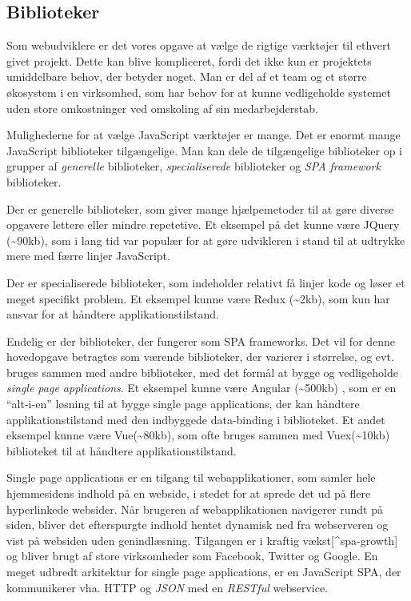 \documentclass[]{article}
\begin{document}
\hypertarget{biblioteker}{%
\subsection{Biblioteker}\label{biblioteker}}

Som webudviklere er det vores opgave at vælge de rigtige værktøjer til
ethvert givet projekt. Dette kan blive kompliceret, fordi det ikke kun
er projektets umiddelbare behov, der betyder noget. Man er del af et
team og et større økosystem i en virksomhed, som har behov for at kunne
vedligeholde systemet uden store omkostninger ved omskoling af sin
medarbejderstab.

Mulighederne for at vælge JavaScript værktøjer er mange. Det er enormt
mange JavaScript biblioteker tilgængelige. Man kan dele de tilgængelige
biblioteker op i grupper af \emph{generelle} biblioteker,
\emph{specialiserede} biblioteker og \emph{SPA framework} biblioteker.

Der er generelle biblioteker, som giver mange hjælpemetoder til at gøre
diverse opgavere lettere eller mindre repetetive. Et eksempel på det
kunne være JQuery (\textasciitilde{}90kb), som i lang tid var populær
for at gøre udvikleren i stand til at udtrykke mere med færre linjer
JavaScript.

Der er specialiserede biblioteker, som indeholder relativt få linjer
kode og løser et meget specifikt problem. Et eksempel kunne være Redux
(\textasciitilde{}2kb), som kun har ansvar for at håndtere
applikationstilstand.

Endelig er der biblioteker, der fungerer som SPA frameworks. Det vil for
denne hovedopgave betragtes som værende biblioteker, der varierer i
størrelse, og evt. bruges sammen med andre biblioteker, med det formål
at bygge og vedligeholde \emph{single page applications}. Et eksempel
kunne være Angular (\textasciitilde{}500kb) , som er en ``alt-i-en''
løsning til at bygge single page applications, der kan håndtere
applikationstilstand med den indbyggede data-binding i biblioteket. Et
andet eksempel kunne være Vue(\textasciitilde{}80kb), som ofte bruges
sammen med Vuex(\textasciitilde{}10kb) biblioteket til at håndtere
applikationstilstand.

Single page applications er en tilgang til webapplikationer, som samler
hele hjemmesidens indhold på en webside, i stedet for at sprede det ud
på flere hyperlinkede websider. Når brugeren af webapplikationen
navigerer rundt på siden, bliver det efterspurgte indhold hentet
dynamisk ned fra webserveren og vist på websiden uden genindlæsning.
Tilgangen er i kraftig vækst{[}\^{}spa-growth{]} og bliver brugt af
store virksomheder som Facebook, Twitter og Google. En meget udbredt
arkitektur for single page applications, er en JavaScript SPA, der
kommunikerer vha. HTTP og \emph{JSON} med en \emph{RESTful} webservice.
\end{document}
